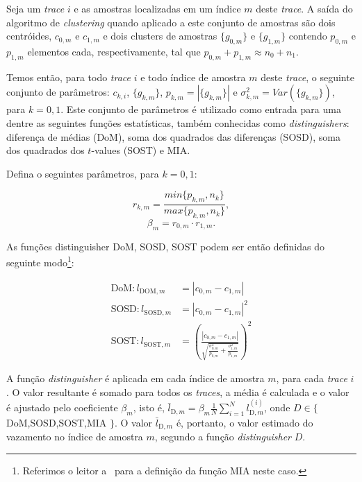 \documentclass{SBCbookchapter}
\begin{document}
Seja um \emph{trace} $i$ e as amostras localizadas em um índice $m$ deste \emph{trace}. A saída do algoritmo de \emph{clustering} quando aplicado a este conjunto de amostras são dois centróides, $c_{0,m}$ e $c_{1,m}$ e dois clusters de amostras $\{g_{0,m}\}$ e $\{g_{1,m}\}$ contendo $p_{0,m}$ e $p_{1,m}$ elementos cada, respectivamente, tal que $p_{0,m} + p_{1,m}\approx n_0 + n_1$.

Temos então, para todo \emph{trace} $i$ e todo índice de amostra $m$ deste \emph{trace}, o seguinte conjunto de parâmetros: $c_{k,i}$, $\{g_{k,m}\}$, $p_{k,m} = |\{g_{k,m}\}|$ e $\sigma^2_{k,m} = Var(\{g_{k,m}\})$, para $k = 0,1$. Este conjunto de parâmetros é utilizado como entrada para uma dentre as seguintes funções estatísticas, também conhecidas como \textit{distinguishers}: diferença de médias (DoM), soma dos quadrados das diferenças (SOSD), soma dos quadrados dos $t$-values (SOST) e MIA.

Defina o seguintes parâmetros, para $k=0,1$:

\begin{equation}	r_{k,m} = \frac{min\{p_{k,m}, n_k\} }{ max\{p_{k,m}, n_k\}},	\end{equation}
\begin{equation}	\beta_{m} = r_{0,m} \cdot r_{1,m}.	\end{equation}

As funções distinguisher DoM, SOSD, SOST podem ser então definidas do seguinte modo\footnote{Referimos o leitor a~\cite{PerinChmielewski2015} para a definição da função MIA neste caso.}:

\begin{align*}
	\text{DoM}: l_{\text{DOM}, m} 	&= |c_{0,m} - c_{1,m}| \\
	\text{SOSD}: l_{\text{SOSD}, m} &= |c_{0,m} - c_{1,m}|^2 \\
	\text{SOST}: l_{\text{SOST}, m} &= \left( \frac{|c_{0,m} - c_{1,m}|} {\sqrt{ \frac{\sigma^2_{0,m}}{p_{0,m}} + \frac{\sigma^2_{1,m}}{p_{1,m}} }}   \right) ^ 2
\end{align*}

A função \emph{distinguisher} é aplicada em cada índice de amostra $m$, para cada \emph{trace} $i$. O valor resultante é somado para todos os \emph{traces}, a média é calculada e o valor é ajustado pelo coeficiente $\beta_{m}$, isto é, $\bar{l}_{\text{D}, m} = \beta_{m} \frac{1}{N} \sum_{i=1}^{N} l^{(i)}_{\text{D}, m}$, onde $D \in \{$ DoM,SOSD,SOST,MIA $\}$. O valor $\bar{l}_{\text{D}, m}$ é, portanto, o valor estimado do vazamento no índice de amostra $m$, segundo a função \emph{distinguisher} $D$.
\end{document}
